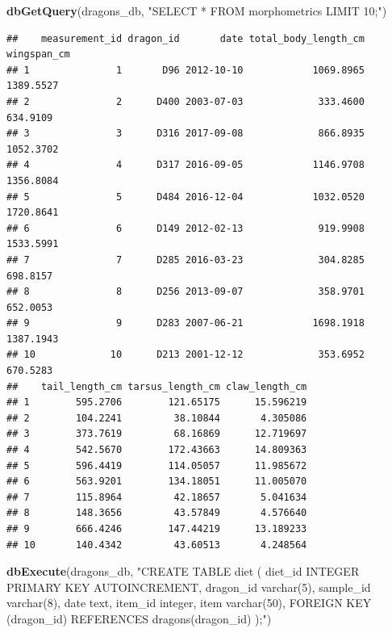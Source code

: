 \documentclass[
]{book}
\newenvironment{Shaded}{\begin{snugshade}}{\end{snugshade}}
\newcommand{\FunctionTok}[1]{\textcolor[rgb]{0.13,0.29,0.53}{\textbf{#1}}}
\newcommand{\NormalTok}[1]{#1}
\newcommand{\StringTok}[1]{\textcolor[rgb]{0.31,0.60,0.02}{#1}}
\begin{document}
\begin{Shaded}
\begin{Highlighting}[]
\FunctionTok{dbGetQuery}\NormalTok{(dragons\_db, }\StringTok{"SELECT * FROM morphometrics LIMIT 10;"}\NormalTok{)}
\end{Highlighting}
\end{Shaded}

\begin{verbatim}
##    measurement_id dragon_id       date total_body_length_cm wingspan_cm
## 1               1       D96 2012-10-10            1069.8965   1389.5527
## 2               2      D400 2003-07-03             333.4600    634.9109
## 3               3      D316 2017-09-08             866.8935   1052.3702
## 4               4      D317 2016-09-05            1146.9708   1356.8084
## 5               5      D484 2016-12-04            1032.0520   1720.8641
## 6               6      D149 2012-02-13             919.9908   1533.5991
## 7               7      D285 2016-03-23             304.8285    698.8157
## 8               8      D256 2013-09-07             358.9701    652.0053
## 9               9      D283 2007-06-21            1698.1918   1387.1943
## 10             10      D213 2001-12-12             353.6952    670.5283
##    tail_length_cm tarsus_length_cm claw_length_cm
## 1        595.2706        121.65175      15.596219
## 2        104.2241         38.10844       4.305086
## 3        373.7619         68.16869      12.719697
## 4        542.5670        172.43663      14.809363
## 5        596.4419        114.05057      11.985672
## 6        563.9201        134.18051      11.005070
## 7        115.8964         42.18657       5.041634
## 8        148.3656         43.57849       4.576640
## 9        666.4246        147.44219      13.189233
## 10       140.4342         43.60513       4.248564
\end{verbatim}

\begin{Shaded}
\begin{Highlighting}[]
\FunctionTok{dbExecute}\NormalTok{(dragons\_db, }\StringTok{"CREATE TABLE diet (}
\StringTok{diet\_id INTEGER PRIMARY KEY AUTOINCREMENT,}
\StringTok{dragon\_id varchar(5),}
\StringTok{sample\_id varchar(8),}
\StringTok{date text,}
\StringTok{item\_id integer,}
\StringTok{item varchar(50),}
\StringTok{FOREIGN KEY (dragon\_id) REFERENCES dragons(dragon\_id)}
\StringTok{);"}\NormalTok{)}
\end{Highlighting}
\end{Shaded}
\end{document}
